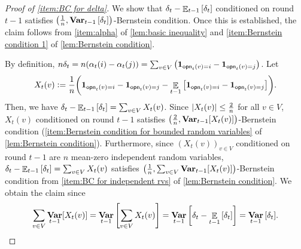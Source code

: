 \documentclass[letterpaper,11pt]{article}
\def\defeq{\mathrel{\mathop:}=}
\DeclarePairedDelimiter{\rbra}{\lparen}{\rparen} %
\DeclarePairedDelimiter{\sbra}{\lbrack}{\rbrack} %
\newcommand{\indicator}{\mathbf{1}}
\DeclareMathOperator*{\E}{\mathbb{E}}
\DeclareMathOperator*{\Var}{\mathbf{Var}}
\newcommand{\alphanorm}{\gamma}
\newcommand{\opinion}{\mathsf{opn}}
\begin{document}
  \begin{proof}[Proof of \cref{item:BC for delta}]
  We show that $\delta_{t}-\E_{t-1}\qty[\delta_{t}]$ conditioned on round $t-1$ satisfies $\qty(\frac{1}{n},\Var_{t-1}\qty[\delta_t])$-Bernstein condition. 
    Once this is established, the claim follows from \cref{item:alpha} of \cref{lem:basic inequality} and \cref{item:Bernstein condition 1} of \cref{lem:Bernstein condition}.

  
      By definition, $n\delta_{t}=n\qty(\alpha_t(i)-\alpha_t(j))=\sum_{v\in V}\qty(\indicator_{\opinion_t(v)=i}-\indicator_{\opinion_t(v)=j})$.
      Let
      \begin{align*}
        X_t(v)\defeq \frac{1}{n}\qty(\indicator_{\opinion_t(v)=i}-\indicator_{\opinion_t(v)=j}-\E_{t-1}\qty[\indicator_{\opinion_t(v)=i}-\indicator_{\opinion_t(v)=j}]).
      \end{align*}
      Then, we have $\delta_{t}-\E_{t-1}\qty[\delta_{t}]=\sum_{v\in V}X_t(v)$.
      Since $\abs{X_t(v)}\leq \frac{2}{n}$ for all $v\in V$, $X_t(v)$ conditioned on round $t-1$ satisfies $\qty(\frac{2}{n},\Var_{t-1}[X_t(v)])$-Bernstein condition (\cref{item:Bernstein condition for bounded random variables} of \cref{lem:Bernstein condition}).
      Furthermore, since $(X_t(v))_{v\in V}$ conditioned on round $t-1$ are $n$ mean-zero independent random variables, 
      $\delta_{t}-\E_{t-1}\qty[\delta_{t}]=\sum_{v\in V}X_t(v)$ satisfies $\qty(\frac{1}{n},\sum_{v\in V}\Var_{t-1}[X_t(v)])$-Bernstein condition from \cref{item:BC for independent rvs} of \cref{lem:Bernstein condition}.
      We obtain the claim since 
      \[
      \sum_{v\in V}\Var_{t-1}[X_t(v)]=\Var_{t-1}\qty[\sum_{v\in V}X_t(v)]=\Var_{t-1}\qty[\delta_{t}-\E_{t-1}\qty[\delta_{t}]]=\Var_{t-1}\qty[\delta_{t}].
      \]
  \end{proof}
\end{document}
